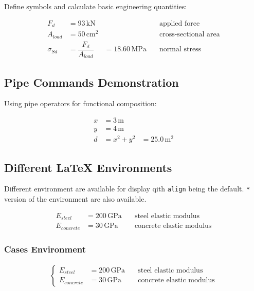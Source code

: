 \documentclass[
  letterpaper,
  DIV=11,
  numbers=noendperiod,
  fleqn]{scrartcl}
\begin{document}
Define symbols and calculate basic engineering quantities:

\begin{align}
F_{d} & = 93{\,}\text{kN} &   & \quad\text{applied force}  \label{eq-QUARTO_EXAMPLE-41g2kkvl}  \\[8pt]
 A_{load} & = 50{\,}\text{cm}^{2} &   & \quad\text{cross-sectional area}  \label{eq-QUARTO_EXAMPLE-3rad1giw}  \\[8pt]
 \sigma_{Sd} & = \dfrac{F_{d}}{A_{load}} & = 18.60{\,}\text{MPa} & \quad\text{normal stress}  \label{eq-QUARTO_EXAMPLE-41gy5jxq} 
\end{align}

\subsection{Pipe Commands Demonstration}\label{sec-pipe}

Using pipe operators for functional composition:

\begin{align}
x & = 3{\,}\text{m} &    \\[8pt]
 y & = 4{\,}\text{m} &    \\[8pt]
 d & = x^{2} + y^{2} & = 25.0{\,}\text{m}^{2} 
\end{align}

\subsection{Different LaTeX
Environments}\label{different-latex-environments}

Different environment are available for display qith \texttt{align}
being the default. \texttt{*} version of the environment are also
available.

\begin{align}
E_{steel} & = 200{\,}\text{GPa} & \quad\text{steel elastic modulus}  \\[8pt]
 E_{concrete} & = 30{\,}\text{GPa} & \quad\text{concrete elastic modulus} 
\end{align}

\subsubsection{Cases Environment}\label{cases-environment}

\begin{align}
    \left\{\begin{aligned}
E_{steel} & = 200{\,}\text{GPa} & \quad\text{steel elastic modulus}  \\[8pt]
 E_{concrete} & = 30{\,}\text{GPa} & \quad\text{concrete elastic modulus} 
    \end{aligned}\right.
\end{align}
\end{document}
